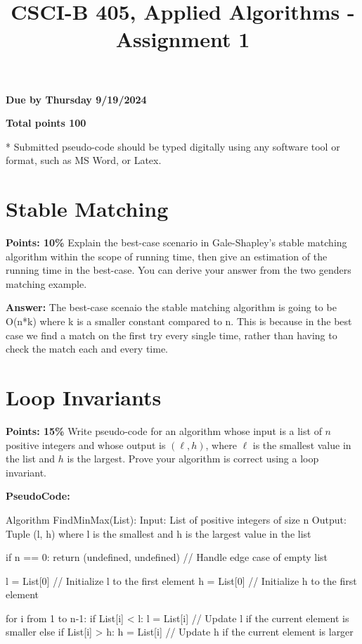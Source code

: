 \documentclass{article}
\title{CSCI-B 405, Applied Algorithms - Assignment 1}
\date{}
\begin{document}
\maketitle

\textbf{Due by Thursday 9/19/2024}

\textbf{Total points 100}

* Submitted pseudo-code should be typed digitally using any software tool or format, such as MS Word, or Latex.

\section{Stable Matching}

\textbf{Points: 10\%} Explain the best-case scenario in Gale-Shapley's stable matching algorithm within the scope of running time, then give an estimation of the running time in the best-case. You can derive your answer from the two genders matching example.



\textbf{Answer:} The best-case scenaio the stable matching algorithm is going to be O(n*k) where k is a smaller constant compared to n.  This is because in the best case we find a match on the first try every single time, rather than having to check the match each and every time. 


\section{Loop Invariants}

\textbf{Points: 15\%} Write pseudo-code for an algorithm whose input is a list of $n$ positive integers and whose output is $(\ell, h)$, where $\ell$ is the smallest value in the list and $h$ is the largest. Prove your algorithm is correct using a loop invariant.


\textbf{PseudoCode: }

Algorithm FindMinMax(List):
    Input: List of positive integers of size n
    Output: Tuple (l, h) where l is the smallest and h is the largest value in the list

    if n == 0:
        return (undefined, undefined)  // Handle edge case of empty list

    l = List[0]   // Initialize l to the first element
    h = List[0]   // Initialize h to the first element

    for i from 1 to n-1:
        if List[i] < l:
            l = List[i]  // Update l if the current element is smaller
        else if List[i] > h:
            h = List[i]  // Update h if the current element is larger
\end{document}
